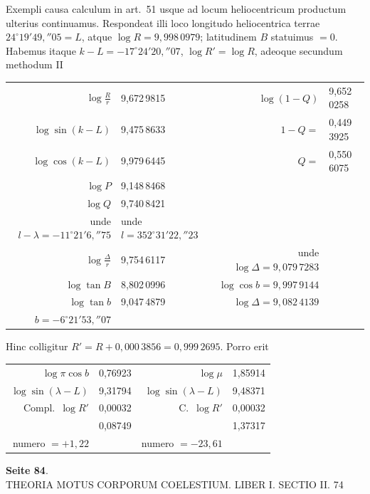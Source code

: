 \documentclass[12pt,a4paper]{article}
\begin{document}
Exempli causa calculum in art.~51 usque ad locum heliocentricum productum ulterius continuamus. Respondeat illi loco longitudo heliocentrica terrae $24^\circ 19' 49{,}''05 = L$, atque $\log R = 9{,}998\,0979$; latitudinem $B$ statuimus $= 0$. Habemus itaque $k - L = -17^\circ 24' 20{,}''07$, $\log R' = \log R$, adeoque secundum methodum II

\begin{center}
\begin{tabular}{r@{\;\ldots\ldots\;}l@{\qquad}r@{\;\ldots\ldots\;}l}
$\log \frac{R}{r}$ & 9,672\,9815 & $\log(1-Q)$ & 9,652\,0258 \\
$\log \sin(k - L)$ & 9,475\,8633 & $1 - Q =$ & 0,449\,3925 \\
$\log \cos(k - L)$ & 9,979\,6445 & $Q =$ & 0,550\,6075 \\
\hline
$\log P$ & 9,148\,8468 \\
$\log Q$ & 9,740\,8421 \\
\hline
unde $l - \lambda = -11^\circ 21' 6{,}''75$ & unde $l = 352^\circ 31' 22{,}''23$ \\
$\log \frac{\Delta}{r}$ & 9,754\,6117 & unde $\log \Delta = 9{,}079\,7283$ \\
$\log \tan B$ & 8,802\,0996 & $\log \cos b = 9{,}997\,9144$ \\
$\log \tan b$ & 9,047\,4879 & $\log \Delta = 9{,}082\,4139$ \\
\hline
$b = -6^\circ 21' 53{,}''07$ & & \\
\end{tabular}
\end{center}

Hinc colligitur $R' = R + 0{,}000\,3856 = 0{,}999\,2695$. Porro erit

\begin{center}
\begin{tabular}{r@{\;\ldots\ldots\;}l@{\qquad}r@{\;\ldots\ldots\;}l}
$\log \pi \cos b$ & 0,76923 & $\log \mu$ & 1,85914 \\
$\log \sin(\lambda - L)$ & 9,31794 & $\log \sin(\lambda - L)$ & 9,48371 \\
Compl.~$\log R'$ & 0,00032 & C.~$\log R'$ & 0,00032 \\
\hline
& 0,08749 & & 1,37317 \\
numero $= +1{,}22$ & & numero $= -23{,}61$ & \\
\end{tabular}
\end{center}

\textbf{Seite 84}.\\
THEORIA MOTUS CORPORUM COELESTIUM. LIBER I. SECTIO II. 74
\end{document}
